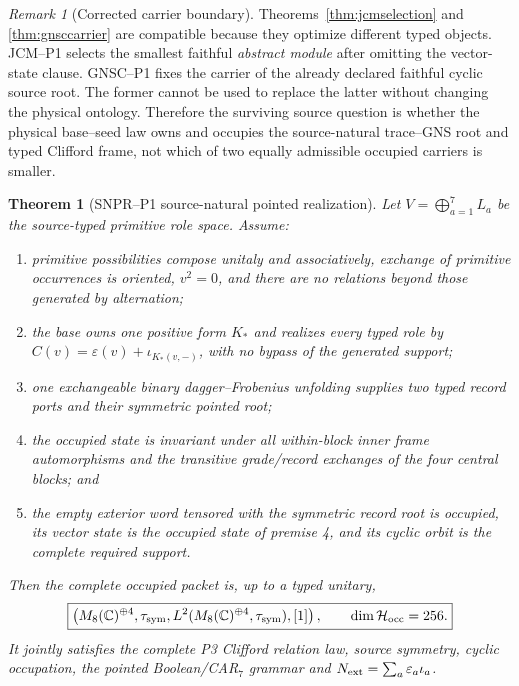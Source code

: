 \documentclass[11pt,a4paper]{article}
\newtheorem{theorem}[definition]{Theorem}
\theoremstyle{remark}
\newtheorem{remark}[definition]{Remark}
\begin{document}
\begin{remark}[Corrected carrier boundary]
Theorems~\ref{thm:jcmselection} and \ref{thm:gnsccarrier} are compatible
because they optimize different typed objects.  JCM--P1 selects the smallest
faithful \emph{abstract module} after omitting the vector-state clause.
GNSC--P1 fixes the carrier of the already declared faithful cyclic source
root.  The former cannot be used to replace the latter without changing the
physical ontology.  Therefore the surviving source question is whether the
physical base--seed law owns and occupies the source-natural trace--GNS root
and typed Clifford frame, not which of two equally admissible occupied
carriers is smaller.
\end{remark}

\begin{theorem}[SNPR--P1 source-natural pointed realization]
Let $V=\bigoplus_{a=1}^{7}L_a$ be the source-typed primitive role space.
Assume:
\begin{enumerate}
 \item primitive possibilities compose unitaly and associatively, exchange of
 primitive occurrences is oriented, $v^2=0$, and there are no relations
 beyond those generated by alternation;
 \item the base owns one positive form $K_*$ and realizes every typed role by
 $C(v)=\varepsilon(v)+\iota_{K_*(v,-)}$, with no bypass of the generated
 support;
 \item one exchangeable binary dagger--Frobenius unfolding supplies two typed
 record ports and their symmetric pointed root;
 \item the occupied state is invariant under all within-block inner frame
 automorphisms and the transitive grade/record exchanges of the four central
 blocks; and
 \item the empty exterior word tensored with the symmetric record root is
 occupied, its vector state is the occupied state of premise 4, and its cyclic
 orbit is the complete required support.
\end{enumerate}
Then the complete occupied packet is, up to a typed unitary,
\begin{equation}
 \boxed{
 \left(
  M_8(\mathbb C)^{\oplus4},\tau_{\rm sym},
  L^2(M_8(\mathbb C)^{\oplus4},\tau_{\rm sym}),[1]
 \right),
 \qquad \dim\mathcal H_{\rm occ}=256.}
 \label{eq:snprpacket}
\end{equation}
It jointly satisfies the complete P3 Clifford relation law, source symmetry,
cyclic occupation, the pointed Boolean/CAR$_7$ grammar and
$N_{\rm ext}=\sum_a\varepsilon_a\iota_a$.
\label{thm:snprcompletion}
\end{theorem}
\end{document}
